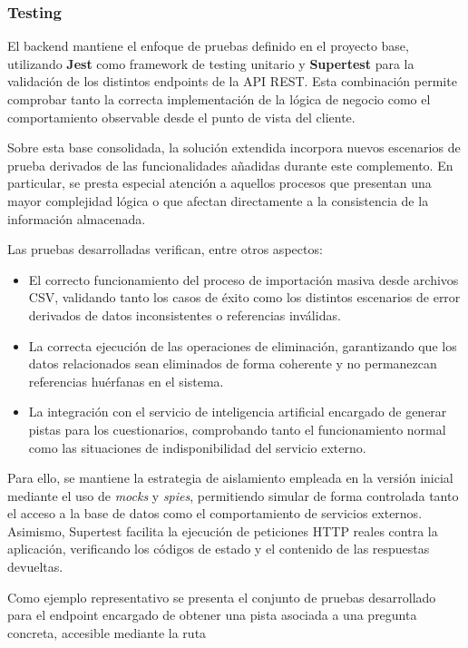 \subsubsection{Testing}

El backend mantiene el enfoque de pruebas definido en el proyecto base, utilizando \textbf{Jest} como framework de testing unitario y \textbf{Supertest} para la validación de los distintos endpoints de la API REST. Esta combinación permite comprobar tanto la correcta implementación de la lógica de negocio como el comportamiento observable desde el punto de vista del cliente.

Sobre esta base consolidada, la solución extendida incorpora nuevos escenarios de prueba derivados de las funcionalidades añadidas durante este complemento. En particular, se presta especial atención a aquellos procesos que presentan una mayor complejidad lógica o que afectan directamente a la consistencia de la información almacenada.

Las pruebas desarrolladas verifican, entre otros aspectos:

\begin{itemize}
    \item El correcto funcionamiento del proceso de importación masiva desde archivos CSV, validando tanto los casos de éxito como los distintos escenarios de error derivados de datos inconsistentes o referencias inválidas.
    \item La correcta ejecución de las operaciones de eliminación, garantizando que los datos relacionados sean eliminados de forma coherente y no permanezcan referencias huérfanas en el sistema.
    \item La integración con el servicio de inteligencia artificial encargado de generar pistas para los cuestionarios, comprobando tanto el funcionamiento normal como las situaciones de indisponibilidad del servicio externo.
\end{itemize}

Para ello, se mantiene la estrategia de aislamiento empleada en la versión inicial mediante el uso de \textit{mocks} y \textit{spies}, permitiendo simular de forma controlada tanto el acceso a la base de datos como el comportamiento de servicios externos. Asimismo, Supertest facilita la ejecución de peticiones HTTP reales contra la aplicación, verificando los códigos de estado y el contenido de las respuestas devueltas.

Como ejemplo representativo se presenta el conjunto de pruebas desarrollado para el endpoint encargado de obtener una pista asociada a una pregunta concreta, accesible mediante la ruta 

